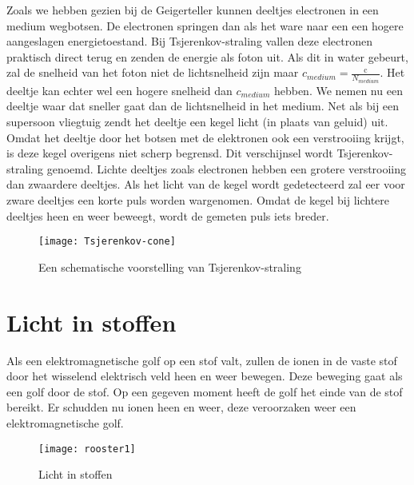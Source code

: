 Zoals we hebben gezien bij de Geigerteller kunnen deeltjes electronen
in een medium wegbotsen. De electronen springen dan als het ware naar
een een hogere aangeslagen energietoestand. Bij Tsjerenkov-straling
vallen deze electronen praktisch direct terug en zenden de energie
als foton uit. Als dit in water gebeurt, zal de snelheid van het foton
niet de lichtsnelheid zijn maar $c_{medium}=\frac{\mathrm{c}}{N_{medium}}$.
Het deeltje kan echter wel een hogere snelheid dan $c_{medium}$ hebben.
We nemen nu een deeltje waar dat sneller gaat dan de lichtsnelheid
in het medium. Net als bij een supersoon vliegtuig zendt het deeltje
een kegel licht (in plaats van geluid) uit. Omdat het deeltje door
het botsen met de elektronen ook een verstrooiing krijgt, is deze
kegel overigens niet scherp begrensd. Dit verschijnsel wordt Tsjerenkov-straling
genoemd. Lichte deeltjes zoals electronen hebben een grotere verstrooiing
dan zwaardere deeltjes. Als het licht van de kegel wordt gedetecteerd
zal eer voor zware deeltjes een korte puls worden wargenomen. Omdat
de kegel bij lichtere deeltjes heen en weer beweegt, wordt de gemeten
puls iets breder.

\begin{figure}[H]
\noindent \begin{centering}
\texttt{[image: Tsjerenkov-cone]}
\par\end{centering}

\caption{Een schematische voorstelling van Tsjerenkov-straling}
\end{figure}


\section{Licht in stoffen}

Als een elektromagnetische golf op een stof valt, zullen de ionen
in de vaste stof door het wisselend elektrisch veld heen en weer bewegen.
Deze beweging gaat als een golf door de stof. Op een gegeven moment
heeft de golf het einde van de stof bereikt. Er schudden nu ionen
heen en weer, deze veroorzaken weer een elektromagnetische golf.

\begin{figure}[H]
\noindent \begin{centering}
\texttt{[image: rooster1]}
\par\end{centering}

\caption{Licht in stoffen}
\end{figure}



